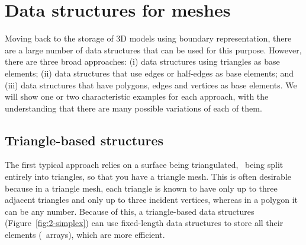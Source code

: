 \section{Data structures for meshes}

Moving back to the storage of 3D models using boundary representation, there are a large number of data structures that can be used for this purpose.
However, there are three broad approaches: (i) data structures using triangles as base elements; (ii) data structures that use edges or half-edges as base elements; and (iii) data structures that have polygons, edges and vertices as base elements.
We will show one or two characteristic examples for each approach, with the understanding that there are many possible variations of each of them.

\subsection{Triangle-based structures}

The first typical approach relies on a surface being triangulated, \ie\ being split entirely into triangles, so that you have a triangle mesh.
This is often desirable because in a triangle mesh, each triangle is known to have only up to three adjacent triangles and only up to three incident vertices, whereas in a polygon it can be any number.
Because of this, a triangle-based data structures (Figure~\ref{fig:2-simplex}) can use fixed-length data structures to store all their elements (\eg\ arrays), which are more efficient.

